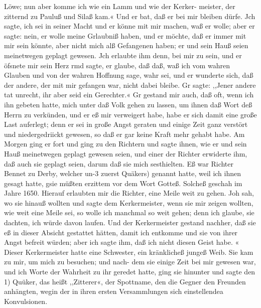 Löwe; nun aber komme ich wie ein Lamm und wie der Kerker-
meister, der zitternd zu Pauluß und Silaß kam.« Und er bat,
daß er bei mir bleiben dürfe. Jch sagte, ich sei in seiner Macht
und er könne mit mir machen, waß er wolle; aber er sagte:
nein, er wolle meine Grlaubniß haben, und er möchte, daß er
immer mit mir sein könnte, aber nicht mich alß Gefangenen haben;
er und sein Hauß seien meinetwegen geplagt gewesen. Jch erlaubte
ihm denn, bei mir zu sein, und er öfsnete mir sein Herz rmd
sagte, er glaube, daß daß, waß ich vom wahren Glauben und
von der wahren Hoffnung sage, wahr sei, und er wunderte sich,
daß der andere, der mit mir gefangen war, nicht dabei bleibe.
Gr sagte: ,,Jener andere tat unrecht, ihr aber seid ein Gerechter.«
Gr gestand mir auch, daß oft, wenn ich ihn gebeten hatte, mich
unter daß Volk gehen zu lassen, um ihnen daß Wort deß Herrn
zu verkünden, und er eß mir verweigert habe, habe er sich damit
eine große Last auferlegt; denn er sei in große Angst geraten
und einige Zeit ganz verstört und niedergedriickt gewesen, so daß
er gar keine Kraft mehr gehabt habe. Am Morgen ging er fort
und ging zu den Richtern und sagte ihnen, wie er und sein Hauß
meinetwegen geplagt gewesen seien, und einer der Richter erwiderte
ihm, daß auch sie geplagt seien, darum daß sie mich sesthielten.
Eß war Richter Bennet zu Derby, welcher un-3 zuerst Quäkers)
genannt hatte, weil ich ihnen gesagt hatte, gsie müßten erzittem
vor dem Wort Gotteß. Solcheß geschah im Jahre 1650.
Hierauf erlaubten mir die Richter, eine Meile weit zu gehen.
Joh sah, wo sie hinauß wollten und sagte dem Kerkermeister,
wenn sie mir zeigen wollten, wie weit eine Meile sei, so wolle
ich manchmal so weit gehen; denn ich glaube, sie dachten, ich
würde davon laufen. Und der Kerkermeister gestand nachher,
daß sie eß in dieser Absicht gestattet hätten, damit ich entkomme
und sie von ihrer Angst befreit würden; aber ich sagte ihm, daß
ich nicht diesen Geist habe. «
Dieser Kerkermeister hatte eine Schwester, ein kränklicheß
jungeß Weib. Sie kam zu mir, um mich zu besuchen; und nach-
dem sie einige Zeit bei mir gewesen war, und ich Worte der
Wahrheit zu ihr geredet hatte, ging sie hinunter und sagte den
1) Quüker, das heißt ,,Zitterer«, der Spottname, den die Gegner den
Freunden anhängten, wegin der in ihren ersten Versammlungen sich einstellendea
Konvulsionen.


